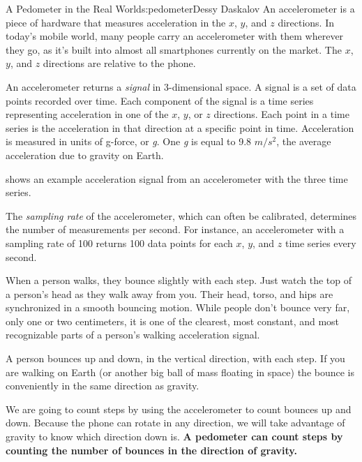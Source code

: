 \begin{aosachapter}{A Pedometer in the Real World}{s:pedometer}{Dessy Daskalov}
An accelerometer is a piece of hardware that measures acceleration in
the $x$, $y$, and $z$ directions. In today's mobile world, many people
carry an accelerometer with them wherever they go, as it's built into
almost all smartphones currently on the market. The $x$, $y$, and $z$
directions are relative to the phone.

An accelerometer returns a \emph{signal} in 3-dimensional space. A
signal is a set of data points recorded over time. Each component of the
signal is a time series representing acceleration in one of the $x$,
$y$, or $z$ directions. Each point in a time series is the acceleration
in that direction at a specific point in time. Acceleration is measured
in units of g-force, or \emph{g}. One \emph{g} is equal to 9.8 $m/s^2$,
the average acceleration due to gravity on Earth.

 shows an example
acceleration signal from an accelerometer with the three time series.


The \emph{sampling rate} of the accelerometer, which can often be
calibrated, determines the number of measurements per second. For
instance, an accelerometer with a sampling rate of 100 returns 100 data
points for each $x$, $y$, and $z$ time series every second.

\label{lets-talk-about-a-walk}

When a person walks, they bounce slightly with each step. Just watch the
top of a person's head as they walk away from you. Their head, torso,
and hips are synchronized in a smooth bouncing motion. While people
don't bounce very far, only one or two centimeters, it is one of the
clearest, most constant, and most recognizable parts of a person's
walking acceleration signal.

A person bounces up and down, in the vertical direction, with each step.
If you are walking on Earth (or another big ball of mass floating in
space) the bounce is conveniently in the same direction as gravity.

We are going to count steps by using the accelerometer to count bounces
up and down. Because the phone can rotate in any direction, we will take
advantage of gravity to know which direction down is. \textbf{A
pedometer can count steps by counting the number of bounces in the
direction of gravity.}


\end{aosachapter}
